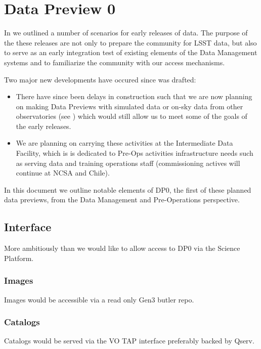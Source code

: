 \section{Data Preview 0}\label{sec:dp0}

In  we outlined a number of scenarios for early releases of \RO data.
The purpose of the these releases are not only to prepare the community for LSST data, but also to serve as an early integration test of existing elements of the Data Management systems and to familiarize the community with our access mechanisms.  

Two major new developments have occured since  was drafted:

\begin{itemize}
  
\item There have since been delays in construction such that we are now planning on making Data Previews with \RO simulated data or on-sky data from other observatories (see ) which would still allow us to meet some of the goals of the early releases. 

\item We are planning on carrying these activities at the Intermediate Data Facility, which is is dedicated to Pre-Ops activities infrastructure needs such as serving data and training operations staff (commissioning actives will continue at NCSA and Chile).

\end{itemize}

In this document we outline notable elements of DP0, the first of these planned data previews, from the Data Management and Pre-Operations perspective. 


\subsection {Interface}
More ambitiously than   we would like to allow access to DP0 via
the Science Platform.
\subsubsection{Images}
Images would be accessible via a read only Gen3 butler repo.
\subsubsection{Catalogs}
Catalogs would be served via the VO TAP interface preferably backed by Qserv.



